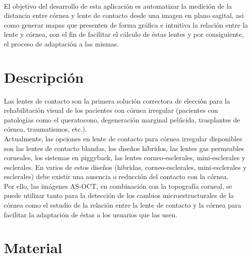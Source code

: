 \documentclass[12pt]{article}
\begin{document}
\paragraph{}
El objetivo del desarrollo de esta aplicación es automatizar la medición de la distancia entre córnea y lente de contacto desde una imagen en plano sagital, asi como generar mapas que presenten de forma gráfica e intuitiva la relación entre la lente y córnea, con el fin de facilitar el cálculo de éstas lentes y por consiguiente, el proceso de adaptación a las mismas.

\newpage
\section{Descripción}
\paragraph{}
Las lentes de contacto son la primera solución correctora de elección para la rehabilitación visual de los pacientes con córnea irregular (pacientes con patologías como el queratocono, degeneración marginal pelúcida, trasplantes de córnea, traumatismos, etc.). \\

Actualmente, las opciones en lente de contacto para córnea irregular disponibles son las lentes de contacto blandas, los diseños híbridos, las lentes gas permeables corneales, los sistemas en piggyback, las lentes corneo-esclerales, mini-esclerales y esclerales. En varios de estos diseños (hibridas, corneo-esclerales, mini-esclerales y esclerales) debe existir una ausencia o reducción del contacto con la córnea. \\

Por ello, las imágenes AS-OCT, en combinación con la topografía corneal, se puede utilizar tanto para la detección de los cambios microestructurales de la córnea como el estudio de la relación entre la lente de contacto y la córnea para facilitar la 
adaptación de éstas a los usuarios que las usen.

\newpage
\section{Material}
\end{document}
